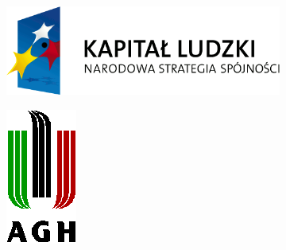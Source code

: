 \documentclass[pdflatex,en]{aghdpl}  %
\begin{document}
\begin{figure}[h!]
	\centering
	\begin{subfigure}[b]{0.4\textwidth}
		\includegraphics[width=\textwidth, keepaspectratio=true]{images/kapital.png}
	\end{subfigure}
	\qquad
	\begin{subfigure}[b]{0.1\textwidth}
		\includegraphics[width=\textwidth, keepaspectratio=true]{images/agh.png}

\end{subfigure}
\end{figure}
\end{document}
